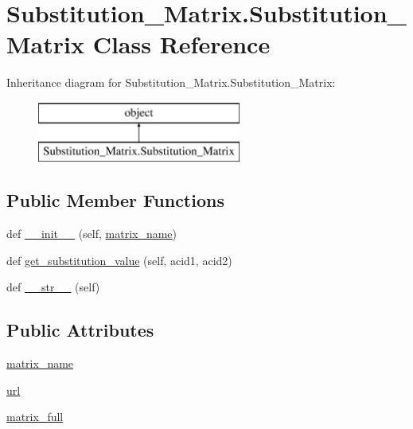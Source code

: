 \hypertarget{class_substitution___matrix_1_1_substitution___matrix}{}\section{Substitution\+\_\+\+Matrix.\+Substitution\+\_\+\+Matrix Class Reference}
\label{class_substitution___matrix_1_1_substitution___matrix}
Inheritance diagram for Substitution\+\_\+\+Matrix.\+Substitution\+\_\+\+Matrix\+:\begin{figure}[H]
\begin{center}
\leavevmode
\includegraphics[height=2.000000cm]{class_substitution___matrix_1_1_substitution___matrix}
\end{center}
\end{figure}
\subsection*{Public Member Functions}
\begin{DoxyCompactItemize}
\item 
def \hyperlink{class_substitution___matrix_1_1_substitution___matrix_adce790552ac5e28f1176df6eee08ea41}{\+\_\+\+\_\+init\+\_\+\+\_\+} (self, \hyperlink{class_substitution___matrix_1_1_substitution___matrix_a0efcbb6cff66f7bc445ba6f8eee16db4}{matrix\+\_\+name})
\item 
def \hyperlink{class_substitution___matrix_1_1_substitution___matrix_ac1c1ba4d51ec687cb13b09faef89820d}{get\+\_\+substitution\+\_\+value} (self, acid1, acid2)
\item 
def \hyperlink{class_substitution___matrix_1_1_substitution___matrix_ade8bcf1a7cb67967777fe0603ea8383b}{\+\_\+\+\_\+str\+\_\+\+\_\+} (self)
\end{DoxyCompactItemize}
\subsection*{Public Attributes}
\begin{DoxyCompactItemize}
\item 
\hyperlink{class_substitution___matrix_1_1_substitution___matrix_a0efcbb6cff66f7bc445ba6f8eee16db4}{matrix\+\_\+name}
\item 
\hyperlink{class_substitution___matrix_1_1_substitution___matrix_a700c5a4bca5bbe99e8f7d0d66b1cb8e8}{url}
\item 
\hyperlink{class_substitution___matrix_1_1_substitution___matrix_ab77bb34d48cccce60c0377053e415eb0}{matrix\+\_\+full}
\end{DoxyCompactItemize}


